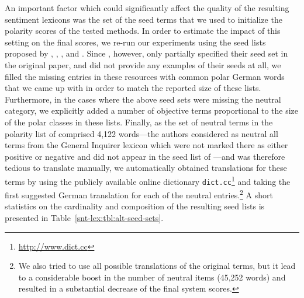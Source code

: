 An important factor which could significantly affect the quality of
the resulting sentiment lexicons was the set of the seed terms that we
used to initialize the polarity scores of the tested methods.  In
order to estimate the impact of this setting on the final scores, we
re-run our experiments using the seed lists proposed by \citet{Hu:04},
\citet{Kim:04}, \citet{Esuli:06c}, and \citet{Remus:10}.  Since
\citet{Hu:04}, however, only partially specified their seed set in the
original paper, and \citet{Kim:04} did not provide any examples of
their seeds at all, we filled the missing entries in these resources
with common polar German words that we came up with in order to match
the reported size of these lists.  Furthermore, in the cases where the
above seed sets were missing the neutral category, we explicitly added
a number of objective terms proportional to the size of the polar
classes in these lists.  Finally, as the set of neutral terms in the
polarity list of \citet{Esuli:06c} comprised 4,122 words---the authors
considered as neutral all terms from the General Inquirer lexicon
\cite{Stone:66} which were not marked there as either positive or
negative and did not appear in the seed list of
\citet{Turney:03}---and was therefore tedious to translate manually,
we automatically obtained translations for these terms by using the
publicly available online dictionary
\texttt{dict.cc}\footnote{\url{http://www.dict.cc}} and taking the
first suggested German translation for each of the neutral
entries.\footnote{We also tried to use all possible translations of
  the original terms, but it lead to a considerable boost in the
  number of neutral items (45,252 words) and resulted in a substantial
  decrease of the final system scores.} A short statistics on the
cardinality and composition of the resulting seed lists is presented
in Table~\ref{snt-lex:tbl:alt-seed-sets}.

